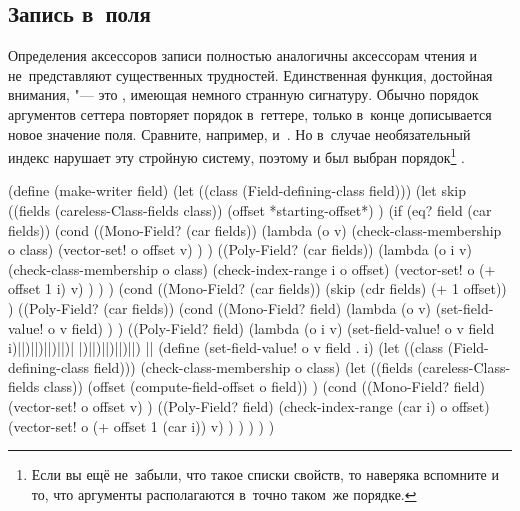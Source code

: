 \subsection{Запись в~поля}\label{objects/accomp/ssect:write}

Определения аксессоров записи полностью аналогичны аксессорам чтения и
не~представляют существенных трудностей. Единственная функция, достойная
внимания, "--- это , имеющая немного странную сигнатуру.
Обычно порядок аргументов сеттера повторяет порядок в~геттере, только в~конце
дописывается новое значение поля. Сравните, например,  и~.
Но в~случае {\Meroonet} необязательный индекс нарушает эту стройную систему,
поэтому и был выбран порядок\footnote{Если вы ещё не~забыли, что такое списки
свойств, то наверяка вспомните и то, что аргументы  располагаются
в~точно таком~же порядке.} .

\begin{code:lisp}
(define (make-writer field)
  (let ((class (Field-defining-class field)))
    (let skip ((fields (careless-Class-fields class))
               (offset *starting-offset*) )
      (if (eq? field (car fields))
          (cond ((Mono-Field? (car fields))
                 (lambda (o v)
                   (check-class-membership o class)
                   (vector-set! o offset v) ) )
                ((Poly-Field? (car fields))
                 (lambda (o i v)
                   (check-class-membership o class)
                   (check-index-range i o offset)
                   (vector-set! o (+ offset 1 i) v) ) ) )
          (cond ((Mono-Field? (car fields))
                 (skip (cdr fields) (+ 1 offset)) )
                ((Poly-Field? (car fields))
                 (cond ((Mono-Field? field)
                        (lambda (o v)
                          (set-field-value! o v field) ) )
                       ((Poly-Field? field)
                        (lambda (o i v)
                          (set-field-value! o v field i)|\:|)|\:|)|\:|)|\:|)|\:%
                                                      |)|\:|)|\:|)|\:|)|\:|)
||
(define (set-field-value! o v field . i)
  (let ((class (Field-defining-class field)))
    (check-class-membership o class)
    (let ((fields (careless-Class-fields class))
          (offset (compute-field-offset o field)) )
      (cond ((Mono-Field? field)
             (vector-set! o offset v) )
            ((Poly-Field? field)
             (check-index-range (car i) o offset)
             (vector-set! o (+ offset 1 (car i)) v) ) ) ) ) )
\end{code:lisp}


